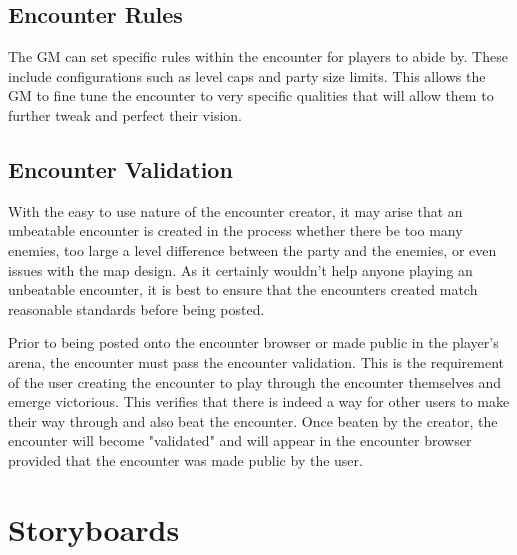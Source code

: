 \documentclass[12pt,a4paper]{report}
\begin{document}
		\subsection{Encounter Rules}
		The GM can set specific rules within the encounter for players to abide by. These include configurations such as level caps and party size limits. This allows the GM to fine tune the encounter to very specific qualities that will allow them to further tweak and perfect their vision.
		\subsection{Encounter Validation}
		With the easy to use nature of the encounter creator, it may arise that an unbeatable encounter is created in the process whether there be too many enemies, too large a level difference between the party and the enemies, or even issues with the map design. As it certainly wouldn't help anyone playing an unbeatable encounter, it is best to ensure that the encounters created match reasonable standards before being posted. 
		
		Prior to being posted onto the encounter browser or made public in the player's arena, the encounter must pass the encounter validation. This is the requirement of the user creating the encounter to play through the encounter themselves and emerge victorious. This verifies that there is indeed a way for other users to make their way through and also beat the encounter. Once beaten by the creator, the encounter will become "validated" and will appear in the encounter browser provided that the encounter was made public by the user.
		
	\section{Storyboards}
\end{document}
